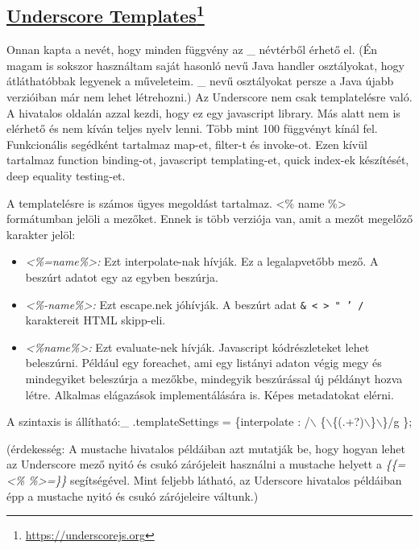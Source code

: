 \subsection[Underscore Templates]{\href{https://underscorejs.org}{Underscore Templates}\footnote{\url{https://underscorejs.org}}}
\label{sec:underscore}
Onnan kapta a nevét, hogy minden függvény az \_ névtérből érhető el.
(Én magam is sokszor használtam saját hasonló nevű Java handler osztályokat, hogy átláthatóbbak legyenek a műveleteim. 
\_ nevű osztályokat persze a Java újabb verzióiban már nem lehet létrehozni.)
Az Underscore nem csak templatelésre való.
A hivatalos oldalán azzal kezdi, hogy ez egy javascript library.
Más alatt nem is elérhető és nem kíván teljes nyelv lenni.
Több mint 100 függvényt kínál fel.
Funkcionális segédként tartalmaz map-et, filter-t és invoke-ot.
Ezen kívül tartalmaz function binding-ot, javascript templating-et, quick index-ek készítését, deep equality testing-et.

A templatelésre is számos ügyes megoldást tartalmaz.
<\% name \%> formátumban jelöli a mezőket.
Ennek is több verziója van, amit a mezőt megelőző karakter jelöl:
\begin{itemize}
\item \emph{<\%=name\%>:}
Ezt interpolate-nak hívják. 
Ez a legalapvetőbb mező.
A beszúrt adatot egy az egyben beszúrja.
\item \emph{<\%-name\%>:}
Ezt escape.nek jóhívják.
A beszúrt adat \texttt{\& < > " ' /} karaktereit HTML skipp-eli.
\item \emph{<\%name\%>:}
Ezt evaluate-nek hívják.
Javascript kódrészleteket lehet beleszúrni.
Például egy foreachet, ami egy listányi adaton végig megy és mindegyiket beleszúrja a mezőkbe, mindegyik beszúrással új példányt hozva létre.
Alkalmas elágazások implementálására is.
Képes metadatokat elérni.
\end{itemize}

A szintaxis is állítható:\_ .templateSettings = \{interpolate : /$\backslash$ \{$\backslash$\{(.+?)$\backslash$\}$\backslash$\}/g \};

(érdekesség: A mustache hivatalos példáiban azt mutatják be, hogy hogyan lehet az Underscore mező nyitó és csukó zárójeleit használni a mustache helyett a \textit{\{\{=<\% \%>=\}\}} segítségével. Mint feljebb látható, az Uderscore hivatalos példáiban épp a mustache nyitó és csukó zárójeleire váltunk.)


